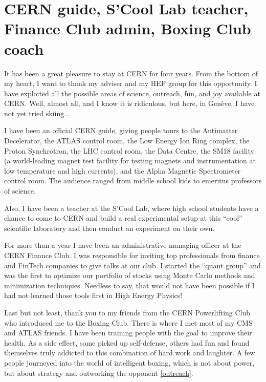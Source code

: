 \section*{CERN guide, S'Cool Lab teacher, Finance Club admin, Boxing Club coach}

It has been a great pleasure to stay at CERN for four years. From the bottom of my heart, I want to thank my adviser and my HEP group for this opportunity. I have exploited all the possible areas of science, outreach, fun, and joy available at CERN. Well, almost all, and I know it is ridiculous, but here, in Gen\`eve, I have not yet tried skiing...

I have been an official CERN guide, giving people tours to the Antimatter Decelerator, the ATLAS control room, the Low Energy Ion Ring complex, the Proton Synchrotron, the LHC control room, the Data Centre, the SM18 facility (a world-leading magnet test facility for testing magnets and instrumentation at low temperature and high currents), and the Alpha Magnetic Spectrometer control room. The audience ranged from middle school kids to emeritus professors of science. 

Also, I have been a teacher at the S'Cool Lab, where high school students have a chance to come to CERN and build a real experimental setup at this ``cool'' scientific laboratory and then conduct an experiment on their own. 

For more than a year I have been an administrative managing officer at the CERN Finance Club. I was responsible for inviting top professionals from finance and FinTech companies to give talks at our club. I started the ``quant group'' and was the first to optimize our portfolio of stocks using Monte Carlo methods and minimization techniques. Needless to say, that would not have been possible if I had not learned those tools first in High Energy Physics!

Last but not least, thank you to my friends from the CERN Powerlifting Club who introduced me to the Boxing Club. There is where I met most of my CMS and ATLAS friends. I have been training people with the goal to improve their health. As a side effect, some picked up self-defense, others had fun and found themselves truly addicted to this combination of hard work and laughter. A few people journeyed into the world of intelligent boxing, which is not about power, but about strategy and outworking the opponent \ref{outreach}. 



